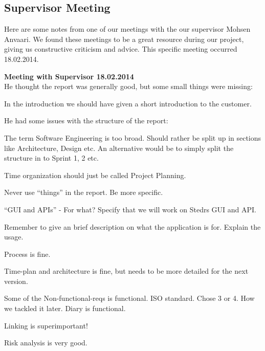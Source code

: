\clearpage

\subsection{Supervisor Meeting}
Here are some notes from one of our meetings with the our supervisor Mohsen Anvaari. 
We found these meetings to be a great resource during our project, giving us constructive criticism and advice. This specific meeting occurred 18.02.2014.

\clearpage
{}

\textbf{Meeting with Supervisor 18.02.2014}\\

He thought the report was generally good, but some small things were missing:

In the introduction we should have given a short introduction to the customer.

He had some issues with the structure of the report:

The term Software Engineering is too broad.
Should rather be split up in sections like Architecture, Design etc. 
An alternative would be to simply split the structure in to Sprint 1, 2 etc.

Time organization should just be called Project Planning.

Never use “things” in the report. Be more specific.

“GUI and APIs” - For what? Specify that we will work on Stedrs GUI and API.

Remember to give an brief description on what the application is for. Explain the usage.

Process is fine.

Time-plan and architecture is fine, but needs to be more detailed for the next version. 

Some of the Non-functional-reqs is functional. ISO standard. Chose 3 or 4. How we tackled it later. Diary is functional.

Linking is superimportant!

Risk analysis is very good.

\clearpage



